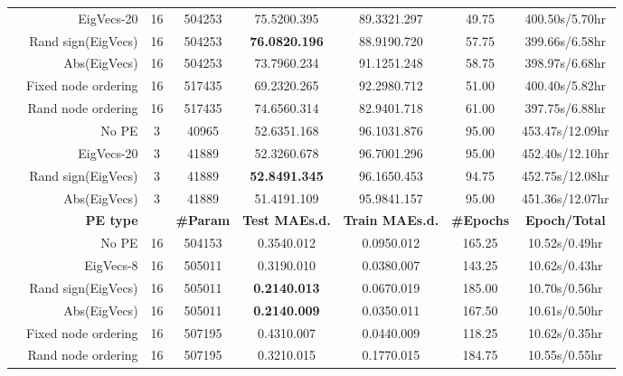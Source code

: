 \documentclass{article}
\newcommand{\best}[1]{{\color{red}\textbf{#1}}}
\begin{document}
\begin{table}[h!]
{\begin{tabular}{c|rcccccc}
         & EigVecs-20 & 16 & 504253 & 75.5200.395 & 89.3321.297 & 49.75 & 400.50s/5.70hr \\
         & Rand sign(EigVecs) & 16 & 504253 & \best{76.0820.196} & 88.9190.720 & 57.75 & 399.66s/6.58hr \\
         & Abs(EigVecs) &  16 & 504253 & 73.7960.234 & 91.1251.248 & 58.75 & 398.97s/6.68hr \\
         & Fixed node ordering & 16 & 517435 & 69.2320.265 & 92.2980.712 & 51.00 & 400.40s/5.82hr \\
         & Rand node ordering & 16 & 517435 & 74.6560.314 & 82.9401.718 & 61.00 & 397.75s/6.88hr \\
         \midrule
        \parbox[t]{2mm}{} & No PE & 3 & 40965 & 52.6351.168 & 96.1031.876 & 95.00 & 453.47s/12.09hr \\
         & EigVecs-20 & 3 & 41889 & 52.3260.678 & 96.7001.296 & 95.00 & 452.40s/12.10hr \\
         & Rand sign(EigVecs) & 3 & 41889 & \best{52.8491.345} & 96.1650.453 & 94.75 & 452.75s/12.08hr \\
         & Abs(EigVecs) & 3 & 41889 & 51.4191.109 & 95.9841.157 & 95.00 & 451.36s/12.07hr \\
        \midrule
         & \textbf{PE type} & \textbf{} & \textbf{\#Param} & \textbf{Test MAEs.d.} & \textbf{Train MAEs.d.} & \textbf{\#Epochs} & \textbf{Epoch/Total} \\
        \midrule
        \parbox[t]{2mm}{} & No PE & 16 & 504153 & 0.3540.012 & 0.0950.012 & 165.25 & 10.52s/0.49hr \\
         & EigVecs-8 & 16 & 505011 & 0.3190.010 & 0.0380.007 & 143.25 & 10.62s/0.43hr \\
         & Rand sign(EigVecs) & 16 & 505011 & \best{0.2140.013} & 0.0670.019 & 185.00 & 10.70s/0.56hr \\
         & Abs(EigVecs) & 16 & 505011 & \best{0.2140.009} & 0.0350.011 & 167.50 & 10.61s/0.50hr \\
         & Fixed node ordering & 16 & 507195 & 0.4310.007 & 0.0440.009 & 118.25 & 10.62s/0.35hr \\
         & Rand node ordering & 16 & 507195 & 0.3210.015 & 0.1770.015 & 184.75 & 10.55s/0.55hr \\
\bottomrule
    \end{tabular}
    }
    \label{tab:PE_study}
\end{table}
\end{document}
